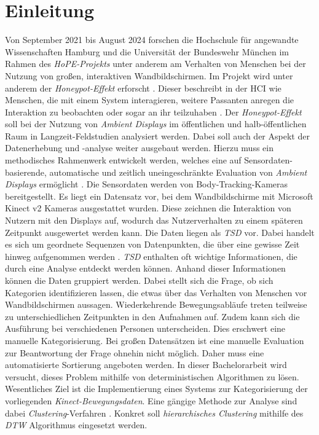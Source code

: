 \chapter{Einleitung}
\label{chapter1}
Von September 2021 bis August 2024 forschen die Hochschule für angewandte Wissenschaften Hamburg
und die Universität der Bundeswehr München im Rahmen des \emph{HoPE-Projekts} unter anderem am Verhalten
von Menschen bei der Nutzung von großen, interaktiven Wandbildschirmen.
Im Projekt wird unter anderem der \emph{Honeypot-Effekt} erforscht \citep{unibw_honeypot-effekt_2021}.
Dieser beschreibt in der \ac{HCI} wie Menschen, die mit einem System interagieren,
weitere Passanten anregen die Interaktion zu beobachten oder sogar an ihr teilzuhaben \citep{wouters_uncovering_2016}.
Der \emph{Honeypot-Effekt} soll bei der Nutzung von \emph{Ambient Displays} im öffentlichen
und halb-öffentlichen Raum in Langzeit-Feldstudien analysiert werden.
Dabei soll auch der Aspekt der Datenerhebung und -analyse weiter ausgebaut werden.
Hierzu muss ein methodisches Rahmenwerk entwickelt werden, welches eine auf Sensordaten-basierende,
automatische und zeitlich uneingeschränkte Evaluation von \emph{Ambient Displays} ermöglicht \citep{unibw_honeypot-effekt_2021}.
Die Sensordaten werden von Body-Tracking-Kameras bereitgestellt.
Es liegt ein Datensatz vor, bei dem Wandbildschirme mit Microsoft Kinect v2 Kameras ausgestattet wurden.
Diese zeichnen die Interaktion von Nutzern mit den Displays auf,
wodurch das Nutzerverhalten zu einem späteren Zeitpunkt ausgewertet werden kann.
Die Daten liegen als \emph{\ac{TSD}} vor.
Dabei handelt es sich um geordnete Sequenzen von Datenpunkten,
die über eine gewisse Zeit hinweg aufgenommen werden \citep{ali_clustering_2019}.
\emph{\ac{TSD}} enthalten oft wichtige Informationen, die durch eine Analyse entdeckt werden können.
Anhand dieser Informationen können die Daten gruppiert werden.
Dabei stellt sich die Frage, ob sich Kategorien identifizieren lassen,
die etwas über das Verhalten von Menschen vor Wandbildschirmen aussagen.
Wiederkehrende Bewegungsabläufe treten teilweise zu unterschiedlichen Zeitpunkten in den Aufnahmen auf.
Zudem kann sich die Ausführung bei verschiedenen Personen unterscheiden.
Dies erschwert eine manuelle Kategorisierung.
Bei großen Datensätzen ist eine manuelle Evaluation zur Beantwortung der Frage ohnehin nicht möglich.
Daher muss eine automatisierte Sortierung angeboten werden.
In dieser Bachelorarbeit wird versucht, dieses Problem mithilfe von deterministischen Algorithmen zu lösen.
Wesentliches Ziel ist die Implementierung eines Systems zur Kategorisierung der vorliegenden \emph{Kinect-Bewegungsdaten}.
Eine gängige Methode zur Analyse sind dabei \emph{Clustering}-Verfahren \citep{aghabozorgi_time-series_2015}.
Konkret soll \emph{hierarchisches Clustering} mithilfe des \emph{\ac{DTW}} Algorithmus eingesetzt werden.

